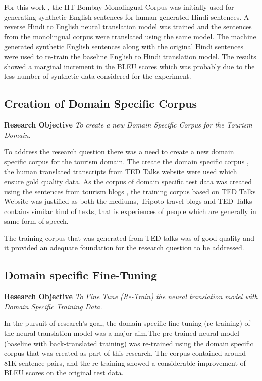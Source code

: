 For this work , the IIT-Bombay Monolingual Corpus was initially used for generating synthetic English sentences for human generated Hindi sentences. A reverse Hindi to English neural translation model was trained and the sentences from the monolingual corpus were translated using the same model. The machine generated synthetic English sentences along with the original Hindi sentences were used to re-train the baseline English to Hindi translation model. The results showed a marginal increment in the BLEU scores which was probably due to the less number of synthetic data considered for the experiment.

\subsection{Creation of Domain Specific Corpus}
\textbf{Research Objective} \textit{To create a new Domain Specific Corpus for the Tourism Domain.}

To address the research question there was a need to create a new domain specific corpus for the tourism domain. The create the domain specific corpus , the human translated transcripts from TED Talks website were used which ensure gold quality data. As the corpus of domain specific test data was created using the sentences from tourism blogs , the training corpus based on TED Talks Website was justified as both the mediums, Tripoto travel blogs and TED Talks contains similar kind of texts, that is experiences of people which are generally in same form of speech. 

The training corpus that was generated from TED talks was of good quality and it provided an adequate foundation for the research question to be addressed.  

\subsection{Domain specific Fine-Tuning}
\textbf{Research Objective} \textit{To Fine Tune (Re-Train) the neural translation model with Domain Specific Training Data.
}

In the pursuit of research's goal, the domain specific fine-tuning (re-training) of the neural translation model was a major aim.The pre-trained neural model (baseline with back-translated training) was re-trained using the domain specific corpus that was created as part of this research. The corpus contained around 81K sentence pairs, and the re-training showed a considerable improvement of BLEU scores on the original test data. 


